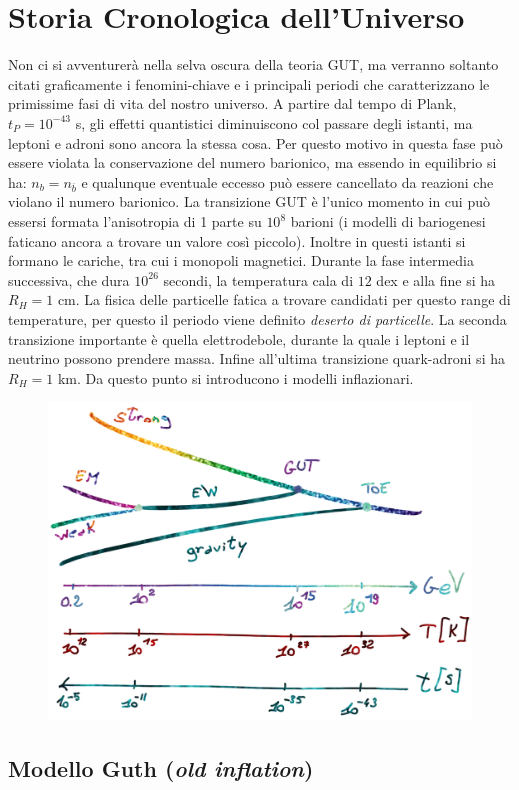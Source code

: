\chapter{Storia Cronologica dell'Universo}\label{5:ch}

Non ci si avventurerà nella selva oscura della teoria GUT, ma verranno soltanto citati graficamente i fenomini-chiave e i principali periodi che caratterizzano le primissime fasi di vita del nostro universo. A partire dal tempo di Plank, $t_P=10^{-43}$ s, gli effetti quantistici diminuiscono col passare degli istanti, ma leptoni e adroni sono ancora la stessa cosa. Per questo motivo in questa fase può essere violata la conservazione del numero barionico, ma essendo in equilibrio si ha: $n_b = n_{\overbar{b}}$ e qualunque eventuale eccesso può essere cancellato da reazioni che violano il numero barionico. La transizione GUT è l'unico momento in cui può essersi formata l'anisotropia di 1 parte su $10^8$ barioni (i modelli di bariogenesi faticano ancora a trovare un valore così piccolo). Inoltre in questi istanti si formano le cariche, tra cui i monopoli magnetici. Durante la fase intermedia successiva, che dura $10^{26}$ secondi, la temperatura cala di $12$ dex e alla fine si ha $R_H = 1$ cm. La fisica delle particelle fatica a trovare candidati per questo range di temperature, per questo il periodo viene definito \textit{deserto di particelle}. La seconda transizione importante è quella elettrodebole, durante la quale i leptoni e il neutrino possono prendere massa. Infine all'ultima transizione quark-adroni si ha $R_H = 1$ km. Da questo punto si introducono i modelli inflazionari.
\begin{figure}[H]
    \centering
    \includegraphics[width=.55 \textwidth]{Pictures/5/fasiprimordiali.png}
    \label{fig:4}
\end{figure}


\section{Modello Guth (\textit{old inflation})}